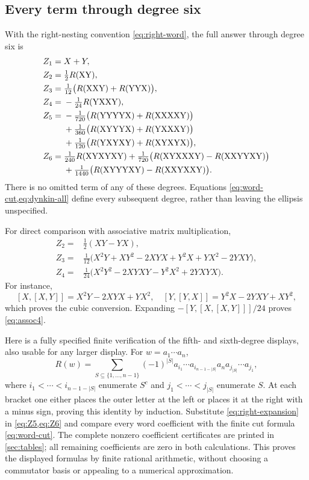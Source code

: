 \subsection{Every term through degree six}
With the right-nesting convention \cref{eq:right-word}, the full answer through degree six is
\begin{align}
 Z_1={}&X+Y,\label{eq:Z1}\\
 Z_2={}&\tfrac12R(\mathrm{XY}),\label{eq:Z2}\\
 Z_3={}&\tfrac1{12}\bigl(R(\mathrm{XXY})+R(\mathrm{YYX})\bigr),\label{eq:Z3}\\
 Z_4={}&-\tfrac1{24}R(\mathrm{YXXY}),\label{eq:Z4}\\
 Z_5={}&-\tfrac1{720}\bigl(R(\mathrm{YYYYX})+R(\mathrm{XXXXY})\bigr)\nonumber\\
       &+\tfrac1{360}\bigl(R(\mathrm{XYYYX})+R(\mathrm{YXXXY})\bigr)\nonumber\\
       &+\tfrac1{120}\bigl(R(\mathrm{YXYXY})+R(\mathrm{XYXYX})\bigr),\label{eq:Z5}\\
 Z_6={}&\tfrac1{240}R(\mathrm{XYXYXY})
       +\tfrac1{720}\bigl(R(\mathrm{XYXXXY})-R(\mathrm{XXYYXY})\bigr)\nonumber\\
       &+\tfrac1{1440}\bigl(R(\mathrm{XYYYXY})-R(\mathrm{XXYXXY})\bigr).\label{eq:Z6}
\end{align}
There is no omitted term of any of these degrees. Equations \cref{eq:word-cut,eq:dynkin-all} define every subsequent degree, rather than leaving the ellipsis unspecified.

For direct comparison with associative matrix multiplication,
\begin{align}
 Z_2={}&\tfrac12(XY-YX),\label{eq:assoc2}\\
 Z_3={}&\tfrac1{12}\bigl(X^2Y+XY^2-2XYX+Y^2X+YX^2-2YXY\bigr),\label{eq:assoc3}\\
 Z_4={}&\tfrac1{24}\bigl(X^2Y^2-2XYXY-Y^2X^2+2YXYX\bigr).\label{eq:assoc4}
\end{align}
For instance,
\[
 [X,[X,Y]]=X^2Y-2XYX+YX^2,
 \quad [Y,[Y,X]]=Y^2X-2YXY+XY^2,
\]
which proves the cubic conversion. Expanding $-[Y,[X,[X,Y]]]/24$ proves \cref{eq:assoc4}.

Here is a fully specified finite verification of the fifth- and sixth-degree displays, also usable for any larger display. For $w=a_1\cdots a_n$,
\begin{equation}\label{eq:right-expansion}
 R(w)=\sum_{S\subseteq\{1,\ldots,n-1\}}(-1)^{|S|}
 a_{i_1}\cdots a_{i_{n-1-|S|}}a_n
 a_{j_{|S|}}\cdots a_{j_1},
\end{equation}
where $i_1<\cdots<i_{n-1-|S|}$ enumerate $S^c$ and $j_1<\cdots<j_{|S|}$ enumerate $S$. At each bracket one either places the outer letter at the left or places it at the right with a minus sign, proving this identity by induction. Substitute \cref{eq:right-expansion} in \cref{eq:Z5,eq:Z6} and compare every word coefficient with the finite cut formula \cref{eq:word-cut}. The complete nonzero coefficient certificates are printed in \cref{sec:tables}; all remaining coefficients are zero in both calculations. This proves the displayed formulas by finite rational arithmetic, without choosing a commutator basis or appealing to a numerical approximation.
